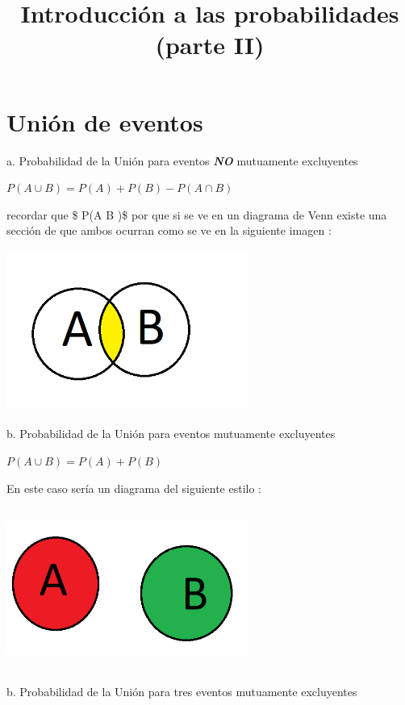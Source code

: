 \documentclass[
]{article}
\title{Introducción a las probabilidades (parte II)}
\author{}
\date{\vspace{-2.5em}}
\begin{document}
\maketitle

{
\setcounter{tocdepth}{2}
\tableofcontents
}
\hypertarget{uniuxf3n-de-eventos}{%
\section{Unión de eventos}\label{uniuxf3n-de-eventos}}

{ a. Probabilidad de la Unión para eventos \textbf{\emph{NO}} mutuamente
excluyentes }

\(P(A \cup B) = P(A) + P(B) - P(A \cap B )\)

recordar que \$ P(A \cap B )\$ por que si se ve en un diagrama de Venn
existe una sección de que ambos ocurran como se ve en la siguiente
imagen :

\includegraphics[width=3.125in,height=2.08333in]{ven_ex1.png}

{ b. Probabilidad de la Unión para eventos mutuamente excluyentes}

\(P(A \cup B) = P(A) + P(B)\)

En este caso sería un diagrama del siguiente estilo :

\includegraphics[width=3.125in,height=2.08333in]{venn_ex2.png}

{ b. Probabilidad de la Unión para tres eventos mutuamente excluyentes }
\end{document}
